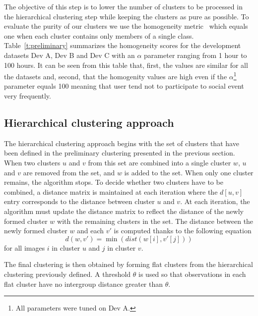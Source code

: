 \documentclass{acm_proc_article-me11_tweaked}
\begin{document}
The objective of this step is to lower the number of clusters to be processed in the hierarchical clustering step while keeping the clusters as pure as possible. To evaluate the purity of our clusters we use the homogeneity metric~\cite{rosenberg2007v} which equals one when each cluster contains only members of a single class. Table~\ref{t:preliminary} summarizes the homogeneity scores for the development datasets Dev A, Dev B and Dev C with an $\alpha$ parameter ranging from 1 hour to 100 hours. It can be seen from this table that, first, the values are similar for all the datasets and, second, that the homogenity values are high even if the $\alpha$\footnote{All parameters were tuned on Dev A.} parameter equals 100 meaning that user tend not to participate to social event very frequently. 

\subsection{Hierarchical clustering approach}\label{HC}

The hierarchical clustering approach begins with the set of clusters that have been defined in the preliminary clustering presented in the previous section. When two clusters $u$ and $v$ from this set are combined into a single cluster $w$, $u$ and $v$ are removed from the set, and $w$ is added to the set. When only one cluster remains, the algorithm stops.
To decide whether two clusters have to be combined, a distance matrix is maintained at each iteration where the $d[u,v]$ entry corresponds to the distance between cluster $u$ and $v$.
At each iteration, the algorithm must update the distance matrix to reflect the distance of the newly formed cluster $w$ with the remaining clusters in the set.
The distance between the newly formed cluster $w$ and each $v'$ is computed thanks to the following equation
\begin{equation}
d(w,v') = \min(dist(w[i],v'[j]))
\end{equation}
for all images $i$ in cluster $u$ and $j$ in cluster $v$.

The final clustering is then obtained by forming flat clusters from the hierarchical clustering previously defined. A threshold $\theta$ is used so that observations in each flat cluster have no intergroup distance greater than $\theta$.

%
%
%
%
\end{document}
